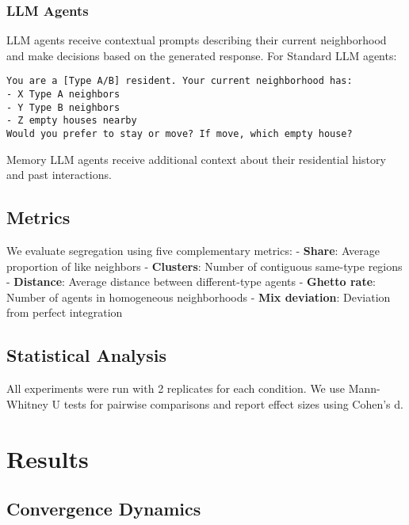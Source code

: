 \documentclass[
  11pt,
]{article}
\begin{document}
\subsubsection{LLM Agents}\label{llm-agents}

LLM agents receive contextual prompts describing their current
neighborhood and make decisions based on the generated response. For
Standard LLM agents:

\begin{verbatim}
You are a [Type A/B] resident. Your current neighborhood has:
- X Type A neighbors
- Y Type B neighbors  
- Z empty houses nearby
Would you prefer to stay or move? If move, which empty house?
\end{verbatim}

Memory LLM agents receive additional context about their residential
history and past interactions.

\subsection{Metrics}\label{metrics}

We evaluate segregation using five complementary metrics: -
\textbf{Share}: Average proportion of like neighbors -
\textbf{Clusters}: Number of contiguous same-type regions -
\textbf{Distance}: Average distance between different-type agents -
\textbf{Ghetto rate}: Number of agents in homogeneous neighborhoods -
\textbf{Mix deviation}: Deviation from perfect integration

\subsection{Statistical Analysis}\label{statistical-analysis}

All experiments were run with 2 replicates for each condition. We use
Mann-Whitney U tests for pairwise comparisons and report effect sizes
using Cohen's d.

\section{Results}\label{results}

\subsection{Convergence Dynamics}\label{convergence-dynamics}
\end{document}

